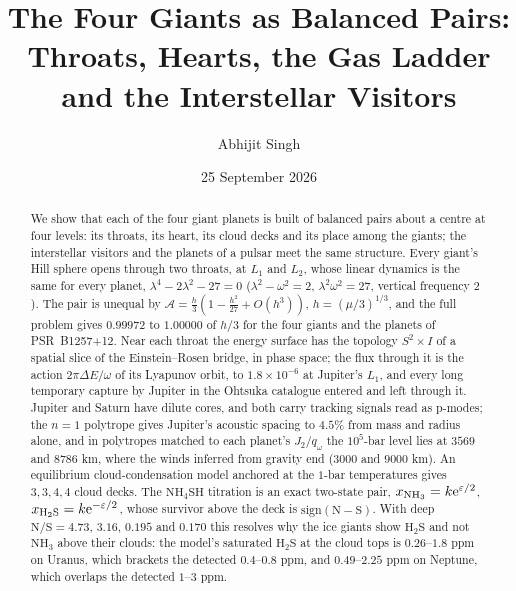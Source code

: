\documentclass[11pt]{article}
\title{\textbf{The Four Giants as Balanced Pairs: Throats, Hearts, the Gas Ladder and the Interstellar Visitors}}
\author{Abhijit Singh}
\date{25 September 2026}
\theoremstyle{definition}\newtheorem{definition}[theorem]{Definition}
\theoremstyle{remark}\newtheorem{remark}[theorem]{Remark}
\newcommand{\NH}{\mathrm{NH_3}}\newcommand{\HS}{\mathrm{H_2S}}\newcommand{\NHSH}{\mathrm{NH_4SH}}
\begin{document}
\maketitle
\begin{abstract}
We show that each of the four giant planets is built of balanced pairs about a centre at four levels: its throats, its heart, its cloud decks and its place among the giants; the interstellar visitors and the planets of a pulsar meet the same structure. Every giant's Hill sphere opens through two throats, at $L_1$ and $L_2$, whose linear dynamics is the same for every planet, $\lambda^4-2\lambda^2-27=0$ ($\lambda^2-\omega^2=2$, $\lambda^2\omega^2=27$, vertical frequency $2$). The pair is unequal by $\mathcal A=\frac h3(1-\frac{h^2}{27}+O(h^3))$, $h=(\mu/3)^{1/3}$, and the full problem gives $0.99972$ to $1.00000$ of $h/3$ for the four giants and the planets of PSR~B1257+12. Near each throat the energy surface has the topology $S^2\times I$ of a spatial slice of the Einstein--Rosen bridge, in phase space; the flux through it is the action $2\pi\Delta E/\omega$ of its Lyapunov orbit, to $1.8\times10^{-6}$ at Jupiter's $L_1$, and every long temporary capture by Jupiter in the Ohtsuka catalogue entered and left through it. Jupiter and Saturn have dilute cores, and both carry tracking signals read as p-modes; the $n=1$ polytrope gives Jupiter's acoustic spacing to $4.5\%$ from mass and radius alone, and in polytropes matched to each planet's $J_2/q_\omega$ the $10^5$-bar level lies at $3569$ and $8786$ km, where the winds inferred from gravity end ($3000$ and $9000$ km). An equilibrium cloud-condensation model anchored at the $1$-bar temperatures gives $3,3,4,4$ cloud decks. The $\NHSH$ titration is an exact two-state pair, $x_{\NH}=k\e^{\varepsilon/2}$, $x_{\HS}=k\e^{-\varepsilon/2}$, whose survivor above the deck is $\mathrm{sign}(\mathrm N-\mathrm S)$. With deep $\mathrm{N/S}=4.73$, $3.16$, $0.195$ and $0.170$ this resolves why the ice giants show $\HS$ and not $\NH$ above their clouds: the model's saturated $\HS$ at the cloud tops is $0.26$--$1.8$ ppm on Uranus, which brackets the detected $0.4$--$0.8$ ppm, and $0.49$--$2.25$ ppm on Neptune, which overlaps the detected $1$--$3$ ppm.


\end{abstract}
\end{document}
